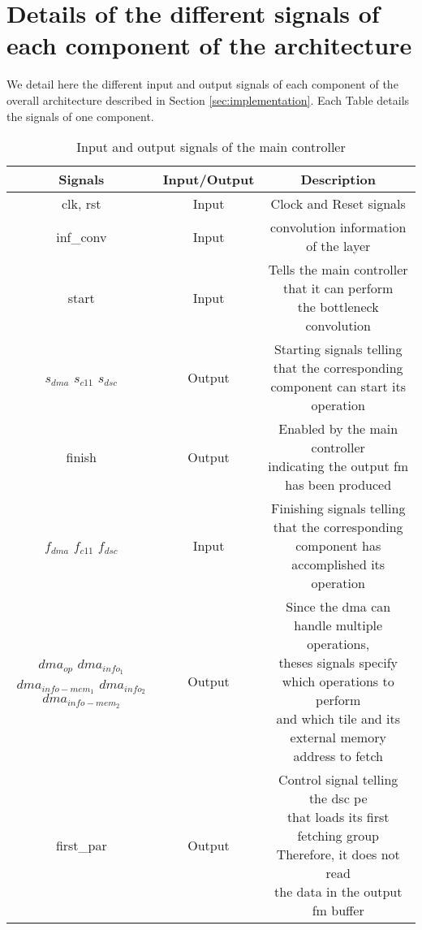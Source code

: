 \chapter{Details of the different signals of each component of the architecture} \label{appendix:sig}
We detail here the different input and output signals of each component of the overall architecture described in Section \ref{sec:implementation}. Each Table details the signals of one component.

\begin{table}[H]
    \begin{tabular}{c|c|c}
        Signals & Input/Output & Description \\
        \hline \hline
        clk, rst & Input & Clock and Reset signals \\
        \hline
        inf\_conv & Input & convolution information of the layer\\
        \hline
        start & Input & \makecell{Tells the main controller that it can perform \\ the bottleneck convolution} \\
        \hline
        \makecell{$s_{dma}$ \\$s_{c11}$\\$s_{dsc}$} & Output & \makecell{Starting signals telling that the corresponding \\ component can start its operation}\\
        \hline
        finish & Output & \makecell{Enabled by the main controller \\ indicating the output \acrshort{fm} has been produced}\\
        \hline
        \makecell{$f_{dma}$ \\$f_{c11}$\\$f_{dsc}$} & Input & \makecell{Finishing signals telling that the corresponding \\ component has accomplished its operation}\\
        \hline
        \makecell{$dma_{op}$\\$dma_{info_1}$\\$dma_{info-mem_1}$\\$dma_{info_2}$\\$dma_{info-mem_2}$} & Output & \makecell{Since the \acrshort{dma} can handle multiple operations,\\ theses signals specify which operations to perform \\ and which tile and its external memory address to fetch}\\
        \hline
        first\_par & Output & \makecell{Control signal telling the \acrshort{dsc} \acrshort{pe} \\ that loads its first fetching group \\ Therefore, it does not read \\ the data in the output \acrshort{fm} buffer} \\
        \hline \hline
    \end{tabular}
    \caption{Input and output signals of the main controller}
    \label{tab:mc_sig}
\end{table}
